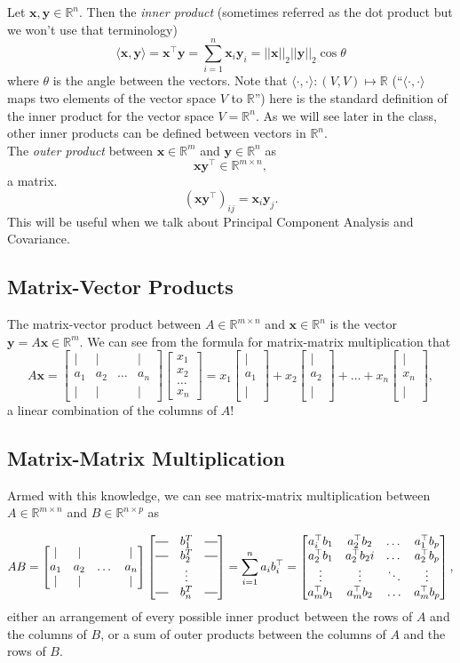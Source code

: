 \documentclass{article}
\newcommand*{\horzbar}{\rule[.5ex]{2.5ex}{0.5pt}}
\newcommand{\1}{\mathbf{1}}
\newcommand{\0}{\mathbf{0}}
\newcommand{\xx}{\mathbf{x}}
\newcommand{\yy}{\mathbf{y}}
\newcommand{\RR}{\mathbb{R}}
\newcommand{\T}{\top}
\newcommand{\m}[1]{\begin{bmatrix} #1 \end{bmatrix}}
\begin{document}
Let $\xx,\yy\in\RR^n$. Then the \textit{inner product} (sometimes referred as the
dot product but we won't use that terminology)
\[
    \langle \xx,\yy \rangle = \xx^\T\yy = \sum_{i=1}^n \xx_i\yy_i = ||\xx||_2||\yy||_2\cos\theta
\]
where $\theta$ is the angle between the vectors.
Note that $\langle \cdot, \cdot \rangle: (V,V) \mapsto \RR$ (``$\langle \cdot, \cdot
\rangle$ maps two elements of the vector space $V$ to $\RR$'') here is the standard definition of
the inner product for the vector space $V=\RR^n$. As we will see later in the
class, other inner products can be defined between vectors in $\RR^n$.\\

The \textit{outer product} between $\xx\in\RR^m$ and $\yy\in\RR^n$ as
\[
    \xx\yy^\T \in \RR^{m\times n},
\]
a matrix.
\[
    (\xx\yy^\T)_{ij} = \xx_i\yy_j.
\]
This will be useful when we talk about Principal Component Analysis and
Covariance.

\subsection{Matrix-Vector Products}

The matrix-vector product between $A\in\RR^{m\times n}$ and $\xx\in\RR^n$ is
the vector $\yy = A\xx \in \RR^m$. We can see from the formula for matrix-matrix
multiplication that
\[
    A\xx = \m{|&|& &|\\a_1&a_2&\dots&a_n\\|&|& &|}\m{x_1\\x_2\\\dots\\x_n} = x_1\m{|\\a_1\\|} + x_2\m{|\\a_2\\|} + \dots + x_n\m{|\\x_n\\|},
\]
a linear combination of the columns of $A$!

\subsection{Matrix-Matrix Multiplication}

Armed with this knowledge, we can see matrix-matrix multiplication between
$A\in\RR^{m\times n}$ and $B\in\RR^{n\times p}$ as

\[
    AB = \m{|&|& &|\\a_1&a_2&\dots&a_n\\|&|& &|}\m{\horzbar&b_1^T&\horzbar\\\horzbar&b_2^T&\horzbar\\&\vdots&\\\horzbar&b_n^T&\horzbar} = \sum_{i=1}^n a_ib_i^\T = \m{a_i^\T b_1&a_2^\T b_2&\dots&a_1^\T b_p\\a_2^\T b_1& a_2^\T b_2i& \dots& a_2^\T b_p\\ \vdots & \vdots & \ddots & \vdots\\ a_m^\T b_1 & a_m^\T b_2 & \hdots & a_m^\T b_p},
\]
either an arrangement of every possible inner product between the rows of $A$
and the columns of $B$, or a sum of outer products between the columns of $A$
and the rows of $B$.
\end{document}
